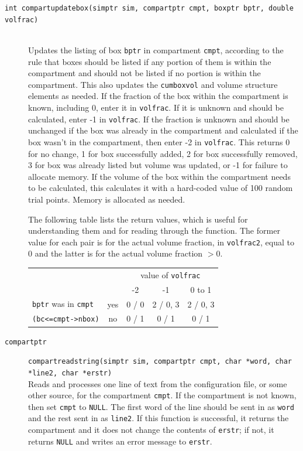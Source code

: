 \documentclass {scrbook}
\newcommand {\ttt} {\texttt}
\begin{document}
\begin{description}
\item[\ttt{int compartupdatebox(simptr sim, compartptr cmpt, boxptr bptr, double volfrac)}]
\hfill \\
Updates the listing of box \ttt{bptr} in compartment \ttt{cmpt}, according to the rule that boxes should be listed if any portion of them is within the compartment and should not be listed if no portion is within the compartment. This also updates the \ttt{cumboxvol} and volume structure elements as needed. If the fraction of the box within the compartment is known, including 0, enter it in \ttt{volfrac}. If it is unknown and should be calculated, enter -1 in \ttt{volfrac}. If the fraction is unknown and should be unchanged if the box was already in the compartment and calculated if the box wasn't in the compartment, then enter -2 in \ttt{volfrac}. This returns 0 for no change, 1 for box successfully added, 2 for box successfully removed, 3 for box was already listed but volume was updated, or -1 for failure to allocate memory. If the volume of the box within the compartment needs to be calculated, this calculates it with a hard-coded value of 100 random trial points. Memory is allocated as needed.

The following table lists the return values, which is useful for understanding them and for reading through the function. The former value for each pair is for the actual volume fraction, in \ttt{volfrac2}, equal to 0 and the latter is for the actual volume fraction $>$0.

\begin{longtable}[c]{lc|ccc}
&&\multicolumn{3}{c}{value of \ttt{volfrac}}\\
&&-2&-1&0 to 1\\
\cline{3-5}
\ttt{bptr} was in \ttt{cmpt}&yes&0 / 0&2 / 0, 3&2 / 0, 3\\
\ttt{(bc<=cmpt->nbox)}&no&0 / 1&0 / 1&0 / 1\\
\end{longtable}

\item[\ttt{compartptr}]
\ttt{compartreadstring(simptr sim, compartptr cmpt, char *word, char *line2, char *erstr)}
\hfill \\
Reads and processes one line of text from the configuration file, or some other source, for the compartment \ttt{cmpt}. If the compartment is not known, then set \ttt{cmpt} to \ttt{NULL}. The first word of the line should be sent in as \ttt{word} and the rest sent in as \ttt{line2}. If this function is successful, it returns the compartment and it does not change the contents of \ttt{erstr}; if not, it returns \ttt{NULL} and writes an error message to \ttt{erstr}.


\end{description}
\end{document}

